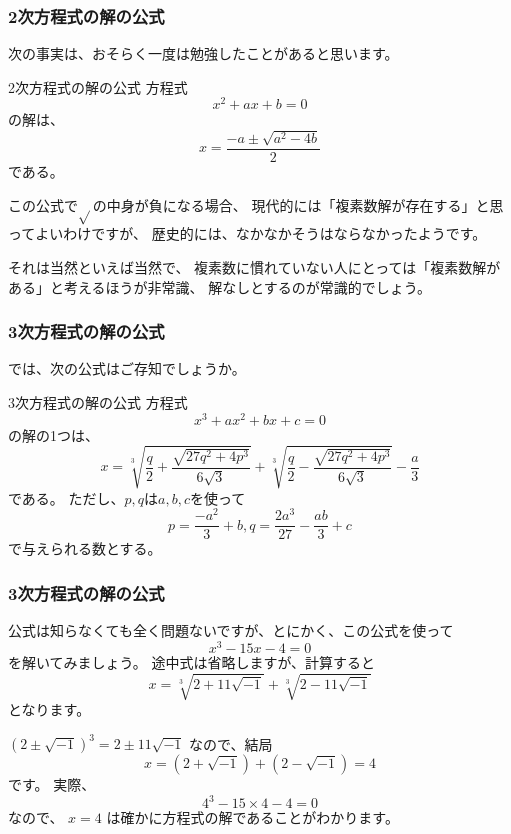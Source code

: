 \documentclass[dvipdfmx]{beamer}
\begin{document}
  \begin{frame}
    \frametitle{2次方程式の解の公式}

    次の事実は、おそらく一度は勉強したことがあると思います。
    \begin{block}{2次方程式の解の公式}
      方程式
      \[
        x^2 + ax + b = 0
      \]
      の解は、
      \[
        x = \frac{-a \pm \sqrt{a^2 - 4b}}{2}
      \]
      である。
    \end{block}
    この公式で$\sqrt{}$の中身が負になる場合、
    現代的には「複素数解が存在する」と思ってよいわけですが、
    歴史的には、なかなかそうはならなかったようです。

    それは当然といえば当然で、
    複素数に慣れていない人にとっては「複素数解がある」と考えるほうが非常識、
    解なしとするのが常識的でしょう。

  \end{frame}

  \begin{frame}
    \frametitle{3次方程式の解の公式}

    では、次の公式はご存知でしょうか。
    \begin{block}{3次方程式の解の公式}
      方程式
      \[
        x^3 + ax^2 + bx + c = 0
      \]
      の解の1つは、
      \[
        x = \sqrt[3]{\frac{q}{2} + \frac{\sqrt{27q^2 + 4p^3}}{6\sqrt{3}}} + \sqrt[3]{\frac{q}{2} - \frac{\sqrt{27q^2 + 4p^3}}{6\sqrt{3}}} - \frac{a}{3}
      \]
      である。
      ただし、$p, q$は$a, b, c$を使って
      \[
        p = \frac{-a^2}{3} + b, q = \frac{2a^3}{27} - \frac{ab}{3} + c
      \]
      で与えられる数とする。
    \end{block}

  \end{frame}

  \begin{frame}
    \frametitle{3次方程式の解の公式}

    公式は知らなくても全く問題ないですが、とにかく、この公式を使って
    \[
      x^3 - 15x - 4 = 0
    \]
    を解いてみましょう。
    途中式は省略しますが、計算すると
    \[
      x = \sqrt[3]{2 + 11\sqrt{-1}} + \sqrt[3]{2 - 11\sqrt{-1}}
    \]
    となります。

    \pause

    $(2 \pm \sqrt{-1})^3 = 2 \pm 11\sqrt{-1}$ なので、結局
    \[
      x = (2 + \sqrt{-1}) + (2 - \sqrt{-1}) = 4
    \]
    です。
    実際、
    \[
      4^3 - 15 \times 4 - 4 = 0
    \]
    なので、 $x=4$ は確かに方程式の解であることがわかります。

  \end{frame}
\end{document}
